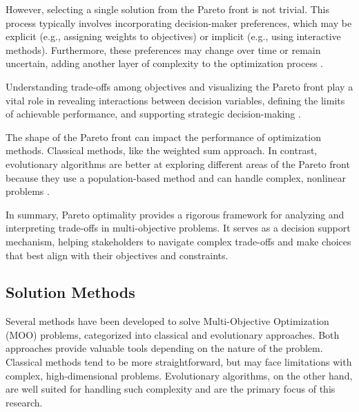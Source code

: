 However, selecting a single solution from the Pareto front is not trivial. This process typically involves incorporating decision-maker preferences, which may be explicit (e.g., assigning weights to objectives) or implicit (e.g., using interactive methods). Furthermore, these preferences may change over time or remain uncertain, adding another layer of complexity to the optimization process \cite{Survey of multi-objective optimization methods}.

Understanding trade-offs among objectives and visualizing the Pareto front play a vital role in revealing interactions between decision variables, defining the limits of achievable performance, and supporting strategic decision-making \cite{Nonlinear multiobjective optimization}. 

The shape of the Pareto front can impact the performance of optimization methods. Classical methods, like the weighted sum approach. In contrast, evolutionary algorithms are better at exploring different areas of the Pareto front because they use a population-based method and can handle complex, nonlinear problems \cite{Nonlinear multiobjective optimization}.

In summary, Pareto optimality provides a rigorous framework for analyzing and interpreting trade-offs in multi-objective problems. It serves as a decision support mechanism, helping stakeholders to navigate complex trade-offs and make choices that best align with their objectives and constraints.

\subsection{Solution Methods}
Several methods have been developed to solve Multi-Objective Optimization (MOO) problems, categorized into classical and evolutionary approaches. Both approaches provide valuable tools depending on the nature of the problem. Classical methods tend to be more straightforward, but may face limitations with complex, high-dimensional problems. Evolutionary algorithms, on the other hand, are well suited for handling such complexity and are the primary focus of this research.

